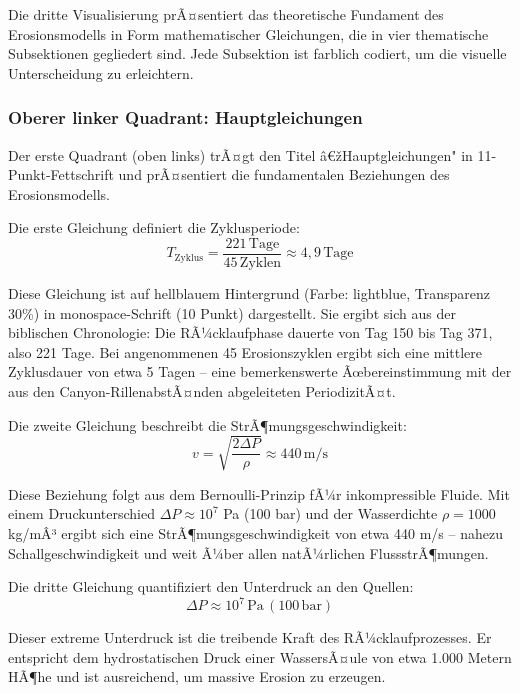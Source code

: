 Die dritte Visualisierung prÃ¤sentiert das theoretische Fundament des Erosionsmodells in Form mathematischer Gleichungen, die in vier thematische Subsektionen gegliedert sind. Jede Subsektion ist farblich codiert, um die visuelle Unterscheidung zu erleichtern.

\subsubsection*{Oberer linker Quadrant: Hauptgleichungen}

Der erste Quadrant (oben links) trÃ¤gt den Titel â€žHauptgleichungen" in 11-Punkt-Fettschrift und prÃ¤sentiert die fundamentalen Beziehungen des Erosionsmodells.

Die erste Gleichung definiert die Zyklusperiode:
\begin{equation*}
T_{\mathrm{Zyklus}} = \frac{221 \, \mathrm{Tage}}{45 \, \mathrm{Zyklen}} \approx 4{,}9 \, \mathrm{Tage}
\end{equation*}

Diese Gleichung ist auf hellblauem Hintergrund (Farbe: lightblue, Transparenz 30\%) in monospace-Schrift (10 Punkt) dargestellt. Sie ergibt sich aus der biblischen Chronologie: Die RÃ¼cklaufphase dauerte von Tag 150 bis Tag 371, also 221 Tage. Bei angenommenen 45 Erosionszyklen ergibt sich eine mittlere Zyklusdauer von etwa 5 Tagen -- eine bemerkenswerte Ãœbereinstimmung mit der aus den Canyon-RillenabstÃ¤nden abgeleiteten PeriodizitÃ¤t.

Die zweite Gleichung beschreibt die StrÃ¶mungsgeschwindigkeit:
\begin{equation*}
v = \sqrt{\frac{2 \Delta P}{\rho}} \approx 440 \, \mathrm{m/s}
\end{equation*}

Diese Beziehung folgt aus dem Bernoulli-Prinzip fÃ¼r inkompressible Fluide. Mit einem Druckunterschied $\Delta P \approx 10^7$ Pa (100 bar) und der Wasserdichte $\rho = 1000$ kg/mÂ³ ergibt sich eine StrÃ¶mungsgeschwindigkeit von etwa 440 m/s -- nahezu Schallgeschwindigkeit und weit Ã¼ber allen natÃ¼rlichen FlussstrÃ¶mungen.

Die dritte Gleichung quantifiziert den Unterdruck an den Quellen:
\begin{equation*}
\Delta P \approx 10^7 \, \mathrm{Pa} \, (100 \, \mathrm{bar})
\end{equation*}

Dieser extreme Unterdruck ist die treibende Kraft des RÃ¼cklaufprozesses. Er entspricht dem hydrostatischen Druck einer WassersÃ¤ule von etwa 1.000 Metern HÃ¶he und ist ausreichend, um massive Erosion zu erzeugen.

